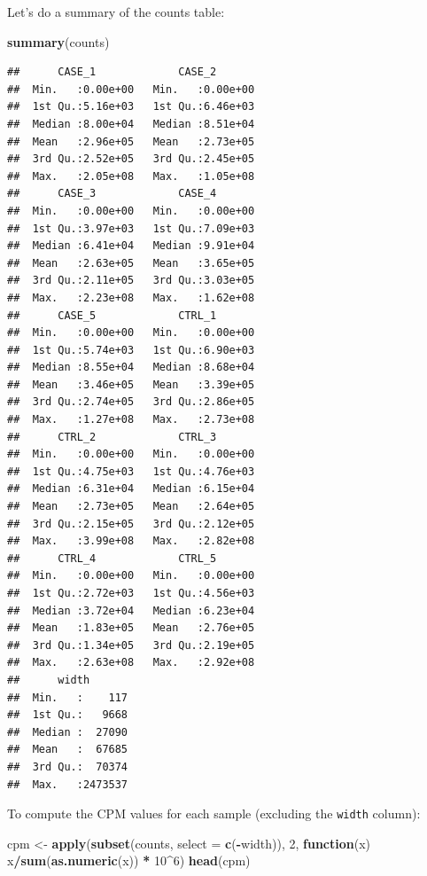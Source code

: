 \documentclass[12pt,]{krantz}
\newenvironment{Shaded}{\begin{snugshade}}{\end{snugshade}}
\newcommand{\ControlFlowTok}[1]{\textcolor[rgb]{0.13,0.29,0.53}{\textbf{#1}}}
\newcommand{\DataTypeTok}[1]{\textcolor[rgb]{0.13,0.29,0.53}{#1}}
\newcommand{\DecValTok}[1]{\textcolor[rgb]{0.00,0.00,0.81}{#1}}
\newcommand{\KeywordTok}[1]{\textcolor[rgb]{0.13,0.29,0.53}{\textbf{#1}}}
\newcommand{\NormalTok}[1]{#1}
\newcommand{\OperatorTok}[1]{\textcolor[rgb]{0.81,0.36,0.00}{\textbf{#1}}}
\newcommand{\StringTok}[1]{\textcolor[rgb]{0.31,0.60,0.02}{#1}}
\begin{document}
Let's do a summary of the counts table:

\begin{Shaded}
\begin{Highlighting}[]
\KeywordTok{summary}\NormalTok{(counts)}
\end{Highlighting}
\end{Shaded}

\begin{verbatim}
##      CASE_1             CASE_2        
##  Min.   :0.00e+00   Min.   :0.00e+00  
##  1st Qu.:5.16e+03   1st Qu.:6.46e+03  
##  Median :8.00e+04   Median :8.51e+04  
##  Mean   :2.96e+05   Mean   :2.73e+05  
##  3rd Qu.:2.52e+05   3rd Qu.:2.45e+05  
##  Max.   :2.05e+08   Max.   :1.05e+08  
##      CASE_3             CASE_4        
##  Min.   :0.00e+00   Min.   :0.00e+00  
##  1st Qu.:3.97e+03   1st Qu.:7.09e+03  
##  Median :6.41e+04   Median :9.91e+04  
##  Mean   :2.63e+05   Mean   :3.65e+05  
##  3rd Qu.:2.11e+05   3rd Qu.:3.03e+05  
##  Max.   :2.23e+08   Max.   :1.62e+08  
##      CASE_5             CTRL_1        
##  Min.   :0.00e+00   Min.   :0.00e+00  
##  1st Qu.:5.74e+03   1st Qu.:6.90e+03  
##  Median :8.55e+04   Median :8.68e+04  
##  Mean   :3.46e+05   Mean   :3.39e+05  
##  3rd Qu.:2.74e+05   3rd Qu.:2.86e+05  
##  Max.   :1.27e+08   Max.   :2.73e+08  
##      CTRL_2             CTRL_3        
##  Min.   :0.00e+00   Min.   :0.00e+00  
##  1st Qu.:4.75e+03   1st Qu.:4.76e+03  
##  Median :6.31e+04   Median :6.15e+04  
##  Mean   :2.73e+05   Mean   :2.64e+05  
##  3rd Qu.:2.15e+05   3rd Qu.:2.12e+05  
##  Max.   :3.99e+08   Max.   :2.82e+08  
##      CTRL_4             CTRL_5        
##  Min.   :0.00e+00   Min.   :0.00e+00  
##  1st Qu.:2.72e+03   1st Qu.:4.56e+03  
##  Median :3.72e+04   Median :6.23e+04  
##  Mean   :1.83e+05   Mean   :2.76e+05  
##  3rd Qu.:1.34e+05   3rd Qu.:2.19e+05  
##  Max.   :2.63e+08   Max.   :2.92e+08  
##      width        
##  Min.   :    117  
##  1st Qu.:   9668  
##  Median :  27090  
##  Mean   :  67685  
##  3rd Qu.:  70374  
##  Max.   :2473537
\end{verbatim}

To compute the CPM values for each sample (excluding the \texttt{width} column):

\begin{Shaded}
\begin{Highlighting}[]
\NormalTok{cpm <-}\StringTok{ }\KeywordTok{apply}\NormalTok{(}\KeywordTok{subset}\NormalTok{(counts, }\DataTypeTok{select =} \KeywordTok{c}\NormalTok{(}\OperatorTok{-}\NormalTok{width)), }\DecValTok{2}\NormalTok{, }\ControlFlowTok{function}\NormalTok{(x) x}\OperatorTok{/}\KeywordTok{sum}\NormalTok{(}\KeywordTok{as.numeric}\NormalTok{(x)) }\OperatorTok{*}\StringTok{ }\DecValTok{10}\OperatorTok{^}\DecValTok{6}\NormalTok{)}
\KeywordTok{head}\NormalTok{(cpm)}
\end{Highlighting}
\end{Shaded}
\end{document}

